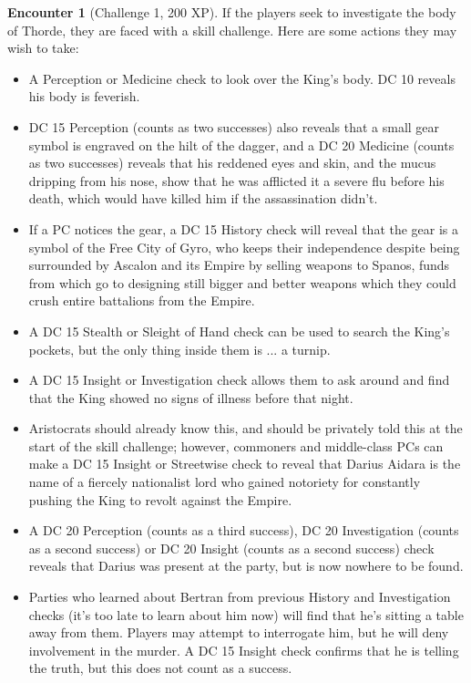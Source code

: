 \documentclass{report}
\theoremstyle{definition}
\newtheorem{enc}{Encounter}[chapter]
\begin{document}
\begin{enc}[Challenge 1, 200 XP]
If the players seek to investigate the body of Thorde, they are faced with a skill challenge. Here are some actions they may wish to take:
\begin{itemize}
\item A Perception or Medicine check to look over the King's body. DC 10 reveals his body is feverish.
\item DC 15 Perception (counts as two successes) also reveals that a small gear symbol is engraved on the hilt of the dagger, and a DC 20 Medicine (counts as two successes) reveals that his reddened eyes and skin, and the mucus dripping from his nose, show that he was afflicted it a severe flu before his death, which would have killed him if the assassination didn't.
\item If a PC notices the gear, a DC 15 History check will reveal that the gear is a symbol of the Free City of Gyro, who keeps their independence despite being surrounded by Ascalon and its Empire by selling weapons to Spanos, funds from which go to designing still bigger and better weapons which they could crush entire battalions from the Empire.
\item A DC 15 Stealth or Sleight of Hand check can be used to search the King's pockets, but the only thing inside them is ... a turnip.
\item A DC 15 Insight or Investigation check allows them to ask around and find that the King showed no signs of illness before that night.
\item Aristocrats should already know this, and should be privately told this at the start of the skill challenge; however, commoners and middle-class PCs can make a DC 15 Insight or Streetwise check to reveal that Darius Aidara is the name of a fiercely nationalist lord who gained notoriety for constantly pushing the King to revolt against the Empire.
\item A DC 20 Perception (counts as a third success), DC 20 Investigation (counts as a second success) or DC 20 Insight (counts as a second success) check reveals that Darius was present at the party, but is now nowhere to be found.
\item Parties who learned about Bertran from previous History and Investigation checks (it's too late to learn about him now) will find that he's sitting a table away from them. Players may attempt to interrogate him, but he will deny involvement in the murder. A DC 15 Insight check confirms that he is telling the truth, but this does not count as a success.
\end{itemize}


\end{enc}
\end{document}
